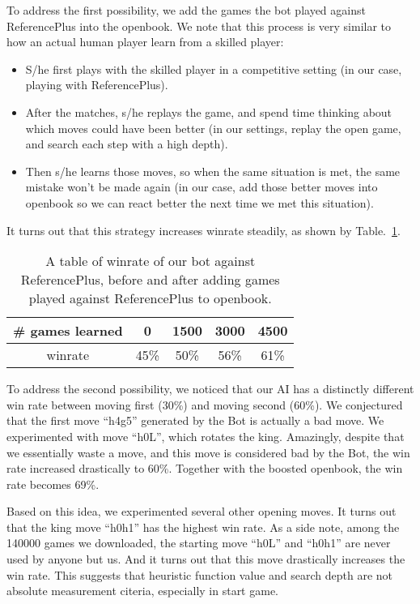 \documentclass[10pt,twosidep]{article}
\begin{document}
To address the first possibility, we add the games the bot played against ReferencePlus into the openbook. 
We note that this process is very similar to how an actual human player learn from a skilled player: 
\begin{itemize}
\item S/he first plays with the skilled player in a competitive setting (in our case, playing with ReferencePlus). 
\item After the matches, s/he replays the game, and spend time thinking about which moves could have been better (in our settings, replay the open game, and search each step with a high depth).
\item Then s/he learns those moves, so when the same situation is met, the same mistake won't be made again 
(in our case, add those better moves into openbook so we can react better the next time we met this situation).
\end{itemize}
It turns out that this strategy increases winrate steadily, as shown by Table.~\ref{tbl:openbook_rf}. 

\begin{table}[h]
\centering
\begin{tabular}{|c|c|c|c|c|}
\hline
\# games learned & 0 & 1500 & 3000 & 4500 \\
\hline
winrate & 45\% & 50\% & 56\% & 61\% \\
\hline
\end{tabular} 
\caption{A table of winrate of our bot against ReferencePlus, before and after adding games played against ReferencePlus to openbook. } 
\label{tbl:openbook_rf}
\end{table}

To address the second possibility, we noticed that our AI has a distinctly different win rate between moving first (30\%) and moving second (60\%). We conjectured that the first move ``h4g5'' generated by the Bot is actually a bad move. We experimented with move ``h0L'', which rotates the king. 
Amazingly, despite that we essentially waste a move, and this move is considered bad by the Bot, 
the win rate increased drastically to 60\%. 
Together with the boosted openbook, the win rate becomes 69\%.

Based on this idea, we experimented several other opening moves. It turns out that the king move ``h0h1'' 
has the highest win rate. 
As a side note, among the 140000 games we downloaded, the starting move ``h0L'' and ``h0h1'' are never used by anyone but us. 
And it turns out that this move drastically increases the win rate. 
This suggests that heuristic function value and search depth are not absolute measurement citeria, 
especially in start game.
\end{document}
